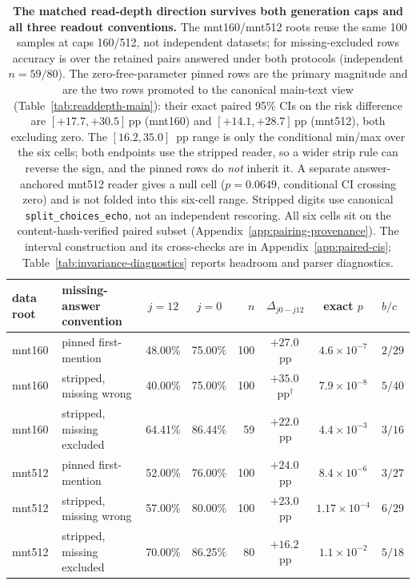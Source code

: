 \begin{table}[htbp]
\centering
\small
\setlength{\tabcolsep}{4pt}
\begin{tabular}{@{}llccrccl@{}}
\toprule
\textbf{data root} & \textbf{missing-answer convention} & $j{=}12$ & $j{=}0$ &
\textbf{$n$} & $\Delta_{j0{-}j12}$ & \textbf{exact $p$} & \textbf{$b/c$} \\
\midrule
mnt160 & pinned first-mention & 48.00\% & 75.00\% & 100 & $+27.0$\,pp & $4.6\times10^{-7}$ & $2/29$ \\
mnt160 & stripped, missing wrong & 40.00\% & 75.00\% & 100 & $+35.0$\,pp$^{\dagger}$ & $7.9\times10^{-8}$ & $5/40$ \\
mnt160 & stripped, missing excluded & 64.41\% & 86.44\% & 59 & $+22.0$\,pp & $4.4\times10^{-3}$ & $3/16$ \\
mnt512 & pinned first-mention & 52.00\% & 76.00\% & 100 & $+24.0$\,pp & $8.4\times10^{-6}$ & $3/27$ \\
mnt512 & stripped, missing wrong & 57.00\% & 80.00\% & 100 & $+23.0$\,pp & $1.17\times10^{-4}$ & $6/29$ \\
mnt512 & stripped, missing excluded & 70.00\% & 86.25\% & 80 & $+16.2$\,pp & $1.1\times10^{-2}$ & $5/18$ \\
\bottomrule
\end{tabular}
\caption{\textbf{The matched read-depth direction survives both generation
caps and all three readout conventions.}
The mnt160/mnt512 roots reuse the same 100 samples at caps 160/512, not
independent datasets; for missing-excluded rows accuracy is over the retained
pairs answered under both protocols (independent $n=59/80$).  The
zero-free-parameter pinned rows are the primary magnitude and are the two rows
promoted to the canonical main-text view (Table~\ref{tab:readdepth-main}): their
exact paired
95\% CIs on the risk difference are $[+17.7,+30.5]$\,pp (mnt160) and
$[+14.1,+28.7]$\,pp (mnt512), both excluding zero.  The $[16.2,35.0]$~pp range
is only the conditional min/max over the six cells; both endpoints use the
stripped reader, so a wider strip rule can reverse the sign, and the pinned
rows do \emph{not} inherit it.  A separate answer-anchored mnt512 reader gives
a null cell ($p{=}0.0649$, conditional CI crossing zero) and is not folded into
this six-cell range.  Stripped digits use canonical
\texttt{split\_choices\_echo}, not an independent rescoring.  All six cells sit
on the content-hash-verified paired subset
(Appendix~\ref{app:pairing-provenance}).  The interval
construction and its cross-checks are in
Appendix~\ref{app:paired-cis}; Table~\ref{tab:invariance-diagnostics} reports
headroom and parser diagnostics.}
\label{tab:readdepth-decisive}
\end{table}
